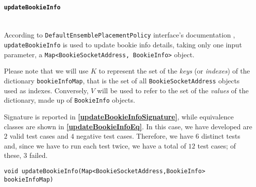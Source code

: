 \documentclass[sigconf]{acmart}
\begin{document}
\paragraph{\texttt{updateBookieInfo}}
\hfill\\
According to \texttt{DefaultEnsemblePlacementPolicy} interface's documentation \cite{EnsemblePlacementPolicy}, \texttt{updateBookieInfo} is used to update bookie info details, taking only one input parameter, a \texttt{Map<BookieSocketAddress, BookieInfo>} object. 

Please note that we will use $K$ to represent the set of the \textit{keys} (or \textit{indexes}) of the dictionary \texttt{bookieInfoMap}, that is the set of all \texttt{BookieSocketAddress} objects used as indexes. Conversely, 
$V$ will be used to refer to the set of the \textit{values} of the dictionary, made up of \texttt{BookieInfo} objects.

Signature is reported in \textbf{\cref{updateBookieInfoSignature}}, while equivalence classes are shown in \textbf{\cref{updateBookieInfoEq}}. In this case, we have developed are $2$ valid test cases and $4$ negative test cases. Therefore, we have $6$ distinct tests and, since we have to run each test twice, we have a total of $12$ test cases; of these, $3$ failed. 

\begin{lstlisting}[frame=lines,basicstyle=\ttfamily\tiny, caption={Signature of method \texttt{updateBookieInfo}}, label={updateBookieInfoSignature}]
void updateBookieInfo(Map<BookieSocketAddress,BookieInfo> bookieInfoMap)
\end{lstlisting}
\end{document}
